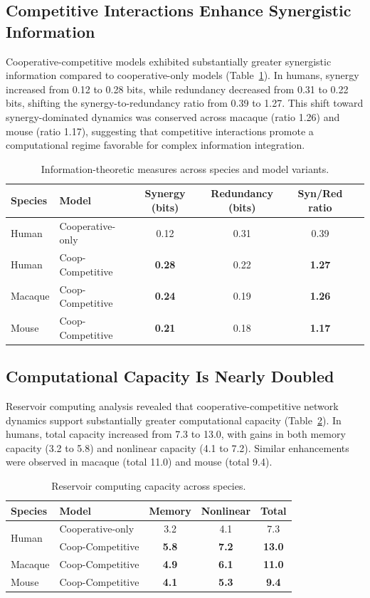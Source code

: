 \documentclass[11pt]{article}
\begin{document}
\subsection{Competitive Interactions Enhance Synergistic Information}

Cooperative-competitive models exhibited substantially greater synergistic information compared to cooperative-only models (Table~\ref{tab:info}). In humans, synergy increased from 0.12 to 0.28 bits, while redundancy decreased from 0.31 to 0.22 bits, shifting the synergy-to-redundancy ratio from 0.39 to 1.27. This shift toward synergy-dominated dynamics was conserved across macaque (ratio 1.26) and mouse (ratio 1.17), suggesting that competitive interactions promote a computational regime favorable for complex information integration.

\begin{table}[h]
\centering
\caption{Information-theoretic measures across species and model variants.}
\label{tab:info}
\begin{tabular}{llcccc}
\toprule
Species & Model & Synergy (bits) & Redundancy (bits) & Syn/Red ratio \\
\midrule
Human & Cooperative-only & 0.12 & 0.31 & 0.39 \\
Human & Coop-Competitive & \textbf{0.28} & 0.22 & \textbf{1.27} \\
Macaque & Coop-Competitive & \textbf{0.24} & 0.19 & \textbf{1.26} \\
Mouse & Coop-Competitive & \textbf{0.21} & 0.18 & \textbf{1.17} \\
\bottomrule
\end{tabular}
\end{table}

\subsection{Computational Capacity Is Nearly Doubled}

Reservoir computing analysis revealed that cooperative-competitive network dynamics support substantially greater computational capacity (Table~\ref{tab:rc}). In humans, total capacity increased from 7.3 to 13.0, with gains in both memory capacity (3.2 to 5.8) and nonlinear capacity (4.1 to 7.2). Similar enhancements were observed in macaque (total 11.0) and mouse (total 9.4).

\begin{table}[h]
\centering
\caption{Reservoir computing capacity across species.}
\label{tab:rc}
\begin{tabular}{llccc}
\toprule
Species & Model & Memory & Nonlinear & Total \\
\midrule
\multirow{2}{*}{Human} & Cooperative-only & 3.2 & 4.1 & 7.3 \\
 & Coop-Competitive & \textbf{5.8} & \textbf{7.2} & \textbf{13.0} \\
Macaque & Coop-Competitive & \textbf{4.9} & \textbf{6.1} & \textbf{11.0} \\
Mouse & Coop-Competitive & \textbf{4.1} & \textbf{5.3} & \textbf{9.4} \\
\bottomrule
\end{tabular}
\end{table}
\end{document}
